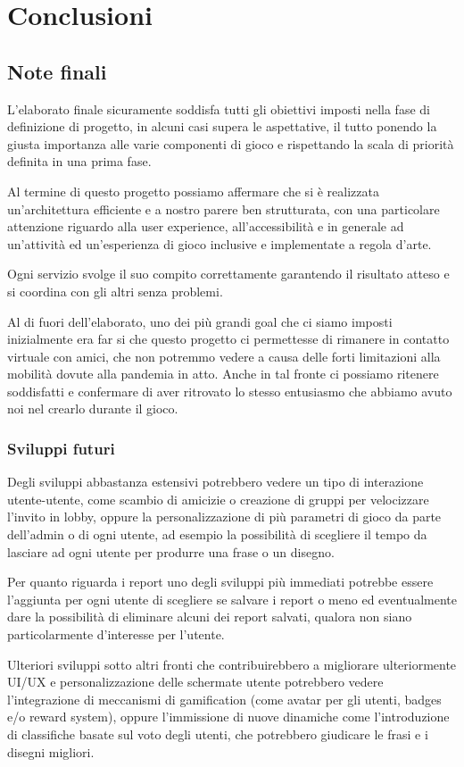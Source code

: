 \chapter{Conclusioni}
\section{Note finali}
L'elaborato finale sicuramente soddisfa tutti gli obiettivi imposti nella fase di definizione di progetto, in alcuni casi supera le aspettative, il tutto ponendo la giusta importanza alle varie componenti di gioco e rispettando la scala di priorità definita in una prima fase. \newline

\noindent Al termine di questo progetto possiamo affermare che si è realizzata un'architettura efficiente e a nostro parere ben strutturata, con una particolare attenzione riguardo alla user experience, all'accessibilità e in generale ad un'attività ed un'esperienza di gioco inclusive e implementate a regola d'arte. \newline

\noindent Ogni servizio svolge il suo compito correttamente garantendo il risultato atteso e si coordina con gli altri senza problemi. \newline

\noindent Al di fuori dell'elaborato, uno dei più grandi goal che ci siamo imposti inizialmente era far si che questo progetto ci permettesse di rimanere in contatto virtuale con amici, che non potremmo vedere a causa delle forti limitazioni alla mobilità dovute alla pandemia in atto. Anche in tal fronte ci possiamo ritenere soddisfatti e confermare di aver ritrovato lo stesso entusiasmo che abbiamo avuto noi nel crearlo durante il gioco.

\subsection{Sviluppi futuri}
Degli sviluppi abbastanza estensivi potrebbero vedere un tipo di interazione utente-utente, come scambio di amicizie o creazione di gruppi per velocizzare l'invito in lobby, oppure la personalizzazione di più parametri di gioco da parte dell'admin o di ogni utente, ad esempio la possibilità di scegliere il tempo da lasciare ad ogni utente per produrre una frase o un disegno.\newline

\noindent Per quanto riguarda i report uno degli sviluppi più immediati potrebbe essere l'aggiunta per ogni utente di scegliere se salvare i report o meno ed eventualmente dare la possibilità di eliminare alcuni dei report salvati, qualora non siano particolarmente d'interesse per l'utente. \newline

\noindent Ulteriori sviluppi sotto altri fronti che contribuirebbero a migliorare ulteriormente UI/UX e personalizzazione delle schermate utente potrebbero vedere l'integrazione di meccanismi di gamification (come avatar per gli utenti, badges e/o reward system), oppure l'immissione di nuove dinamiche come l'introduzione di classifiche basate sul voto degli utenti, che potrebbero giudicare le frasi e i disegni migliori.

\newpage